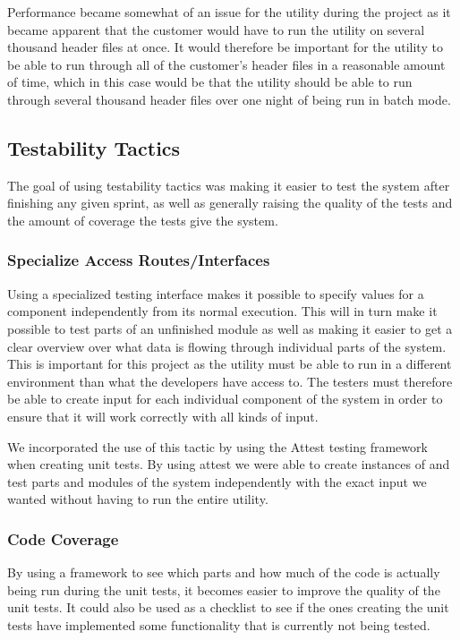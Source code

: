 Performance became somewhat of an issue for the utility during the project as it became apparent that the customer would have to run the utility on several thousand header files at once. It would therefore be important for the utility to be able to run through all of the customer's header files in a reasonable amount of time, which in this case would be that the utility should be able to run through several thousand header files over one night of being run in batch mode.

\subsection{Testability Tactics}
The goal of using testability tactics was making it easier to test the system after finishing any given sprint, as well as generally raising the quality of the tests and the amount of coverage the tests give the system.

\subsubsection{Specialize Access Routes/Interfaces}
Using a specialized testing interface makes it possible to specify values for a component independently from its normal execution. This will in turn make it possible to test parts of an unfinished module as well as making it easier to get a clear overview over what data is flowing through individual parts of the system. This is important for this project as the \gls{utility} must be able to run in a different environment than what the developers have access to. The testers must therefore be able to create input for each individual component of the system in order to ensure that it will work correctly with all kinds of input.

We incorporated the use of this tactic by using the Attest testing framework when creating unit tests. By using attest we were able to create instances of and test parts and modules of the system independently with the exact input we wanted without having to run the entire utility. 

\subsubsection{Code Coverage}
By using a framework to see which parts and how much of the code is actually being run during the unit tests, it becomes easier to improve the quality of the unit tests. It could also be used as a checklist to see if the ones creating the unit tests have implemented some functionality that is currently not being tested.

